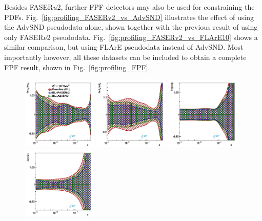 Besides FASER$u$2, further FPF detectors may also be used for constraining the PDFs. 
Fig.~\ref{fig:profiling_FASERv2_vs_AdvSND} illustrates the effect of using the AdvSND pseudodata alone, 
shown together with the previous result of using only FASER$\nu$2 pseudodata. 
Fig.~\ref{fig:profiling_FASERv2_vs_FLArE10} shows a similar comparison, 
but using FLArE pseudodata instead of AdvSND. 
Most importantly however, all these datasets can be included to obtain a complete FPF result, 
shown in Fig.~\ref{fig:profiling_FPF}.

\begin{figure}[t]
\centering
\includegraphics[width=0.32\textwidth]{plots/proton_fasernu2/FASERv2_vs_AdvSND/statOnly_AdvSND_q2_10000_pdf_uv_ratio.pdf}
\includegraphics[width=0.32\textwidth]{plots/proton_fasernu2/FASERv2_vs_AdvSND/statOnly_AdvSND_q2_10000_pdf_dv_ratio.pdf}
\includegraphics[width=0.32\textwidth]{plots/proton_fasernu2/FASERv2_vs_AdvSND/statOnly_AdvSND_q2_10000_pdf_g_ratio.pdf}\\
\includegraphics[width=0.32\textwidth]{plots/proton_fasernu2/FASERv2_vs_AdvSND/statOnly_AdvSND_q2_10000_pdf_Sea_ratio.pdf}

\end{figure}
